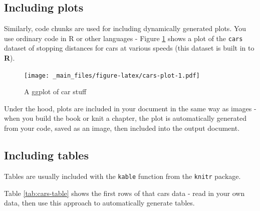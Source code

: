 \documentclass[a4paper, twoside]{templates/ociamthesis}
\newenvironment{Shaded}{\begin{snugshade}}{\end{snugshade}}
\newcommand{\DataTypeTok}[1]{\textcolor[rgb]{0.13,0.29,0.53}{#1}}
\newcommand{\KeywordTok}[1]{\textcolor[rgb]{0.13,0.29,0.53}{\textbf{#1}}}
\newcommand{\NormalTok}[1]{#1}
\newcommand{\OperatorTok}[1]{\textcolor[rgb]{0.81,0.36,0.00}{\textbf{#1}}}
\newcommand{\StringTok}[1]{\textcolor[rgb]{0.31,0.60,0.02}{#1}}
\renewenvironment{Shaded}
{
  \vspace{4pt}%
  \begin{snugshade}%
}{%
  \end{snugshade}%
  \vspace{4pt}%
}
\begin{document}
\hypertarget{including-plots}{%
\subsection{Including plots}\label{including-plots}}

Similarly, code chunks are used for including dynamically generated plots.
You use ordinary code in R or other languages - Figure \ref{fig:cars-plot} shows a plot of the \texttt{cars} dataset of stopping distances for cars at various speeds (this dataset is built in to \textbf{R}).

\begin{Shaded}
\end{Shaded}

\begin{figure}
\centering
\texttt{[image: \_main\_files/figure-latex/cars-plot-1.pdf]}
\caption{\label{fig:cars-plot}A ggplot of car stuff}
\end{figure}

Under the hood, plots are included in your document in the same way as images - when you build the book or knit a chapter, the plot is automatically generated from your code, saved as an image, then included into the output document.

\hypertarget{including-tables}{%
\subsection{Including tables}\label{including-tables}}

Tables are usually included with the \texttt{kable} function from the \texttt{knitr} package.

Table \ref{tab:cars-table} shows the first rows of that cars data - read in your own data, then use this approach to automatically generate tables.

\begin{Shaded}
\end{Shaded}
\end{document}
